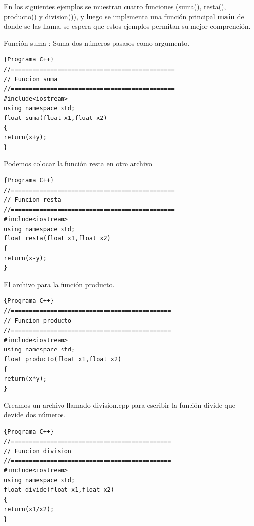 \documentclass[a4paper,12pt,spanish]{article}
\newcommand\mylstcaption{}
\begin{document}
En los siguientes ejemplos se muestran cuatro funciones (suma(), resta(), producto() y division()), y luego se implementa una función principal \textbf{main} de donde se las llama, se espera que estos ejemplos permitan su mejor comprención.\\

\newpage

Función suma : Suma dos números pasasos como argumento.

\renewcommand\mylstcaption{\textbf{suma.cpp}: función suma}

\begin{lstlisting}[frame=trBL,firstnumber=1,caption=\mylstcaption]{Programa C++}
//==============================================
// Funcion suma
//==============================================
#include<iostream>
using namespace std;
float suma(float x1,float x2)
{
return(x+y);
}
\end{lstlisting}

Podemos colocar la función resta en otro archivo

\begin{lstlisting}[frame=trBL,firstnumber=1,caption={\textbf{resta.cpp}: funcion resta}]{Programa C++}
//==============================================
// Funcion resta
//==============================================
#include<iostream>
using namespace std;
float resta(float x1,float x2)
{
return(x-y);
}
\end{lstlisting}

El archivo para la función producto.\\

    \begin{lstlisting}[frame=trBL,firstnumber=0,caption={\textbf{producto.cpp}: función producto}]{Programa C++}
//=============================================
// Funcion producto
//=============================================
#include<iostream>
using namespace std;
float producto(float x1,float x2)
{
return(x*y);
}
\end{lstlisting}
\newpage
Creamos un archivo llamado division.cpp para escribir la función divide que devide dos números.\\
    \begin{lstlisting}[frame=trBL,firstnumber=0,caption={\textbf{division.cpp}: Operaciones Básicas}]{Programa C++}
//=============================================
// Funcion division
//=============================================
#include<iostream>
using namespace std;
float divide(float x1,float x2)
{
return(x1/x2);
}
\end{lstlisting}
\end{document}
